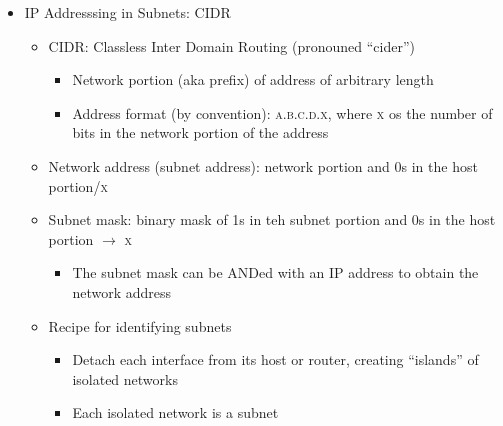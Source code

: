 \begin{itemize}
\begin{itemize}
\begin{itemize}
        \end{itemize}

    \end{itemize}

  \item IP Addresssing in Subnets: CIDR

    \begin{itemize}

      \item CIDR: Classless Inter Domain Routing (pronouned ``cider'')

        \begin{itemize}

          \item Network portion (aka prefix) of address of arbitrary length

          \item Address format (by convention): \textsc{a.b.c.d.x}, where \textsc{x} os the number of bits in the network portion of the address

        \end{itemize}

      \item Network address (subnet address): network portion and 0s in the host portion/\textsc{x}

      \item Subnet mask: binary mask of 1s in teh subnet portion and 0s in the host portion $\to$ \textsc{x}

        \begin{itemize}

          \item The subnet mask can be ANDed with an IP address to obtain the network address

        \end{itemize}

      \item Recipe for identifying subnets

        \begin{itemize}

          \item Detach each interface from its host or router, creating ``islands'' of isolated networks

          \item Each isolated network is a subnet

        \end{itemize}

    \end{itemize}

\end{itemize}



